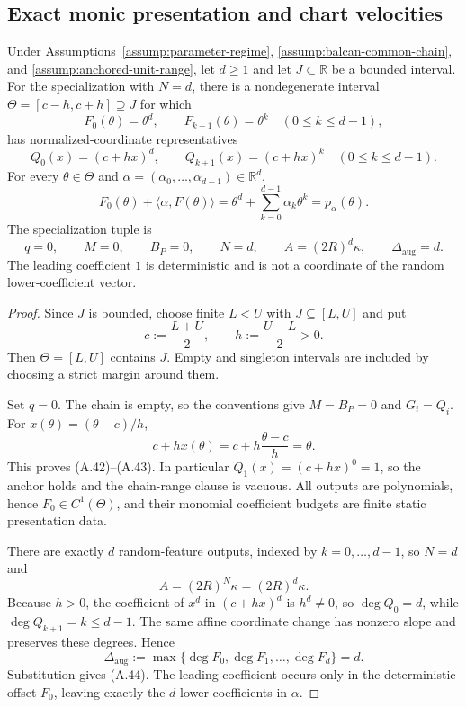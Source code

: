\subsection{Exact monic presentation and chart velocities}
\label{app:monic-charts}

\begin{proposition}
\label{prop:monic-presentation}
Under Assumptions~\ref{assump:parameter-regime},
\ref{assump:balcan-common-chain}, and
\ref{assump:anchored-unit-range}, let $d\geq1$ and let
$J\subset\mathbb R$ be a bounded interval.  For the specialization with
$N=d$, there is a nondegenerate interval
$\Theta=[c-h,c+h]\supseteq J$ for which
\[
F_0(\theta)=\theta^d,
\qquad
F_{k+1}(\theta)=\theta^k\quad(0\leq k\leq d-1),
\tag{A.42}
\]
has normalized-coordinate representatives
\[
Q_0(x)=(c+hx)^d,
\qquad
Q_{k+1}(x)=(c+hx)^k\quad(0\leq k\leq d-1).
\tag{A.43}
\]
For every $\theta\in\Theta$ and
$\alpha=(\alpha_0,\ldots,\alpha_{d-1})\in\mathbb R^d$,
\[
F_0(\theta)+\langle\alpha,F(\theta)\rangle
=\theta^d+\sum_{k=0}^{d-1}\alpha_k\theta^k
=p_\alpha(\theta).
\tag{A.44}
\]
The specialization tuple is
\[
q=0,
\qquad M=0,
\qquad B_P=0,
\qquad N=d,
\qquad A=(2R)^d\kappa,
\qquad \Delta_{\mathrm{aug}}=d.
\tag{A.45}
\]
The leading coefficient $1$ is deterministic and is not a coordinate of the
random lower-coefficient vector.
\end{proposition}

\begin{proof}
Since $J$ is bounded, choose finite $L<U$ with $J\subseteq[L,U]$ and put
\[
c:=\frac{L+U}{2},
\qquad
h:=\frac{U-L}{2}>0.
\]
Then $\Theta=[L,U]$ contains $J$.  Empty and singleton intervals are included
by choosing a strict margin around them.

Set $q=0$.  The chain is empty, so the conventions give
$M=B_P=0$ and $G_i=Q_i$.  For
$x(\theta)=(\theta-c)/h$,
\[
c+hx(\theta)=c+h\frac{\theta-c}{h}=\theta.
\]
This proves (A.42)--(A.43).  In particular
$Q_1(x)=(c+hx)^0=1$, so the anchor holds and the chain-range clause is
vacuous.  All outputs are polynomials, hence $F_0\in C^1(\Theta)$, and their
monomial coefficient budgets are finite static presentation data.

There are exactly $d$ random-feature outputs, indexed by
$k=0,\ldots,d-1$, so $N=d$ and
\[
A=(2R)^N\kappa=(2R)^d\kappa.
\]
Because $h>0$, the coefficient of $x^d$ in $(c+hx)^d$ is
$h^d\neq0$, so $\deg Q_0=d$, while
$\deg Q_{k+1}=k\leq d-1$.  The same affine coordinate change has nonzero
slope and preserves these degrees.  Hence
\[
\Delta_{\mathrm{aug}}
:=\max\{\deg F_0,\deg F_1,\ldots,\deg F_d\}=d.
\]
Substitution gives (A.44).  The leading coefficient occurs only in the
deterministic offset $F_0$, leaving exactly the $d$ lower coefficients in
$\alpha$.
\end{proof}

